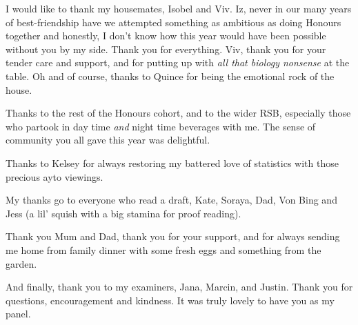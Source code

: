 \begin{center}
    \vspace{0.4cm}  
    
    I would like to thank my housemates, Isobel and Viv. Iz, never in our many years of best-friendship have we attempted something as ambitious as doing Honours together and honestly, I don't know how this year would have been possible without you by my side. Thank you for everything. Viv, thank you for your tender care and support, and for putting up with \textit{all that biology nonsense} at the table.  Oh and of course, thanks to Quince for being the emotional rock of the house. 
    
    \vspace{0.4cm}  
    
    Thanks to the rest of the Honours cohort, and to the wider RSB, especially those who partook in day time \textit{and} night time beverages with me. The sense of community you all gave this year was delightful. 
    
    \vspace{0.4cm}  

    Thanks to Kelsey for always restoring my battered love of statistics with those precious ayto viewings. 
    
    \vspace{0.4cm}  
    
     My thanks go to everyone who read a draft, Kate, Soraya, Dad, Von Bing and Jess (a lil' squish with a big stamina for proof reading). 
    
    \vspace{0.4cm}  
    
    Thank you Mum and Dad, thank you for your support, and for always sending me home from family dinner with some fresh eggs and something from the garden. 
   
    \vspace{0.4cm}  
    
    And finally, thank you to my examiners, Jana, Marcin, and Justin. Thank you for questions, encouragement and kindness. It was truly lovely to have you as my panel. 


\end{center}